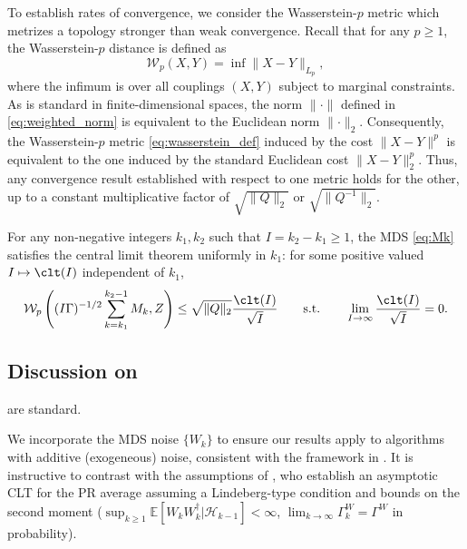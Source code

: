 \documentclass[11pt]{article}
\begin{document}
To establish rates of convergence, we consider the Wasserstein-$p$ metric which metrizes a topology stronger than weak convergence.
Recall that for any $p \geq 1$, the Wasserstein-$p$ distance is defined as 
\begin{equation}\label{eq:wasserstein_def}
    \mathcal{W}_p \left(X, Y \right) = \inf \lVert X - Y \rVert_{L_p} , 
\end{equation}
where the infimum is over all couplings $(X, Y)$ subject to marginal constraints. 
As is standard in finite-dimensional spaces, the norm $\lVert \cdot \rVert$ defined in \eqref{eq:weighted_norm} is equivalent to the Euclidean norm $\lVert \cdot \rVert_2$. 
Consequently, the Wasserstein-$p$ metric \eqref{eq:wasserstein_def} induced by the cost $\lVert X - Y \rVert^p$ is equivalent to the one induced by the standard Euclidean cost $\lVert X - Y \rVert^p_2$. 
Thus, any convergence result established with respect to one metric holds for the other, up to a constant multiplicative factor of $\sqrt{\lVert Q \rVert_2}$ or $\sqrt{\lVert Q^{-1} \rVert_2}$. 
\begin{assumption}\label{ass:CLT}\label{ass:last}
    For any non-negative integers $k_1, k_2$ such that $I = k_2 - k_1  \geq 1$, the MDS \eqref{eq:Mk} satisfies the central limit theorem uniformly in $k_1$: for some positive valued $I \mapsto \clt(I)$ independent of $k_1$,
    \begin{equation*}
        \mathcal{W}_{p} \left( (I \Gamma)^{-1/2} \sum_{k=k_1}^{k_2 - 1} M_k , Z\right) \leq 
        \sqrt{\lVert Q \rVert_2}  \frac{\clt(I)}{\sqrt{I}} \qquad \text{s.t.} \qquad \lim_{I \to \infty} \frac{\clt(I)}{\sqrt{I}} = 0. 
    \end{equation*}
\end{assumption}


\subsection{Discussion on \texorpdfstring{}{Assumptions}}\label{sec:discussion_assumptions}
 are standard.


We incorporate the MDS noise $\{W_k\}$ to ensure our results apply to algorithms with additive (exogeneous) noise, consistent with the framework in \citep{polyakJuditsky}. 
It is instructive to contrast  with the assumptions of \citep{polyakJuditsky}, who establish an asymptotic CLT for the PR average assuming a Lindeberg-type condition and bounds on the second moment ($\sup_{k \geq 1} \mathbb{E}[W_k W_k^\dagger | \mathcal{H}_{k-1}] < \infty$, $\lim_{k \to \infty} \Gamma_k^W = \Gamma^W$ in probability). 
\end{document}

